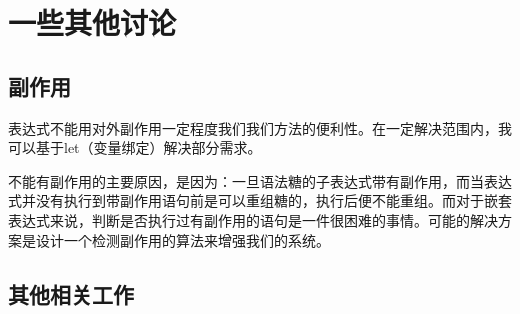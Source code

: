 \section{一些其他讨论}



\subsection{副作用}

表达式不能用对外副作用一定程度我们我们方法的便利性。在一定解决范围内，我可以基于let（变量绑定）解决部分需求。

不能有副作用的主要原因，是因为：一旦语法糖的子表达式带有副作用，而当表达式并没有执行到带副作用语句前是可以重组糖的，执行后便不能重组。而对于嵌套表达式来说，判断是否执行过有副作用的语句是一件很困难的事情。可能的解决方案是设计一个检测副作用的算法来增强我们的系统。

\subsection{其他相关工作}
